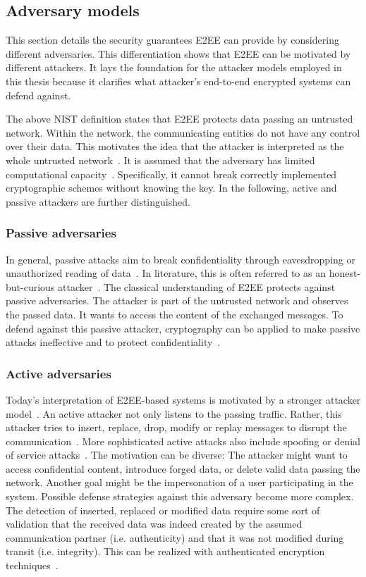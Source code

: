 \documentclass[../main.tex]{subfiles}
\begin{document}
\subsection{Adversary models}
This section details the security guarantees E2EE can provide by considering different adversaries.
This differentiation shows that E2EE can be motivated by different attackers.
It lays the foundation for the attacker models employed in this thesis because it clarifies what attacker's end-to-end encrypted systems can defend against.

The above NIST definition states that E2EE protects data passing an untrusted network.
Within the network, the communicating entities do not have any control over their data.
This motivates the idea that the attacker is interpreted as the whole untrusted network~\cite{Nabeel2017}.
It is assumed that the adversary has limited computational capacity~\cite{Katz2020}. 
Specifically, it cannot break correctly implemented cryptographic schemes without knowing the key.
In the following, active and passive attackers are further distinguished. 

\subsubsection{Passive adversaries}
In general, passive attacks aim to break confidentiality through eavesdropping or unauthorized reading of data~\cite[18]{Eckert2018}. 
In literature, this is often referred to as an honest-but-curious attacker~\cite{Nabeel2017}.
The classical understanding of E2EE protects against passive adversaries. 
The attacker is part of the untrusted network and observes the passed data.
It wants to access the content of the exchanged messages.
To defend against this passive attacker, cryptography can be applied to make passive attacks ineffective and to protect confidentiality~\cite[18]{Eckert2018}.


\subsubsection{Active adversaries}
Today's interpretation of E2EE-based systems is motivated by a stronger attacker model~\cite{Hale2022}.
An active attacker not only listens to the passing traffic.
Rather, this attacker tries to insert, replace, drop, modify or replay messages to disrupt the communication~\cite{Nabeel2017}.
More sophisticated active attacks also include spoofing or denial of service attacks~\cite[19]{Eckert2018}.
The motivation can be diverse: 
The attacker might want to access confidential content, introduce forged data, or delete valid data passing the network.
Another goal might be the impersonation of a user participating in the system.
Possible defense strategies against this adversary become more complex.
The detection of inserted, replaced or modified data require some sort of validation that the received data was indeed created by the assumed communication partner (i.e. authenticity) and that it was not modified during transit (i.e. integrity).
This can be realized with authenticated encryption techniques~\cite{Mallory2022}.
\end{document}
